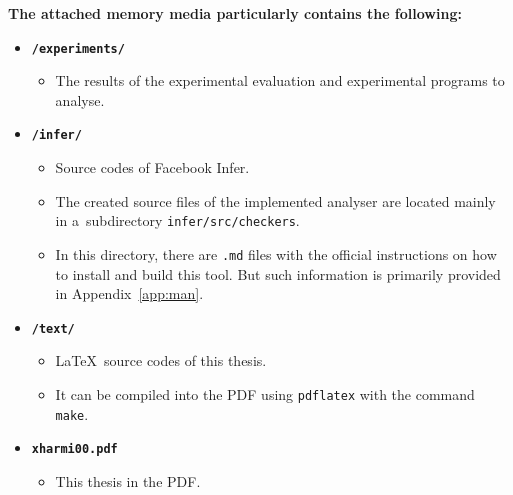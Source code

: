 \textbf{The attached memory media particularly contains the following:}
\begin{itemize}
    \item
        \texttt{\textbf{/experiments/}}

        \begin{itemize}
            \item
                The results of the experimental evaluation and experimental
                programs to analyse.
        \end{itemize}

    \item
        \texttt{\textbf{/infer/}}

        \begin{itemize}
            \item
                Source codes of Facebook Infer.

            \item
                The created source files of the implemented analyser are
                located mainly in a~subdirectory \texttt{infer/src/checkers}.

            \item
                In this directory, there are \texttt{.md} files with the
                official instructions on how to install and build this tool.
                But such information is primarily provided in
                Appendix~\ref{app:man}.
        \end{itemize}

    \item
        \texttt{\textbf{/text/}}

        \begin{itemize}
            \item
                \LaTeX\ source codes of this thesis.
            \item
                It can be compiled into the PDF using \texttt{pdflatex} with
                the command \texttt{make}.
        \end{itemize}

    \item
        \texttt{\textbf{xharmi00.pdf}}

        \begin{itemize}
            \item This thesis in the PDF.
        \end{itemize}
\end{itemize}



